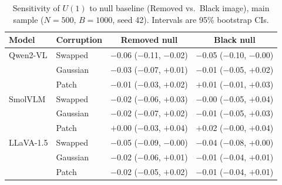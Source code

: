 \begin{table}[t]
\centering
\caption{Sensitivity of $U(1)$ to null baseline (Removed vs.\ Black image),
  main sample ($N=500$, $B=1000$, seed 42). Intervals are 95\% bootstrap CIs.}
\label{tab:nullsens-u}
{\footnotesize\setlength{\tabcolsep}{3pt}%
\begin{tabular}{llcc}
\toprule
\textbf{Model} & \textbf{Corruption} & Removed null & Black null \\
\midrule
Qwen2-VL  & Swapped  & $-$0.06 ($-$0.11, $-$0.02) & $-$0.05 ($-$0.10, $-$0.00) \\
          & Gaussian & $-$0.03 ($-$0.07, $+$0.01) & $-$0.01 ($-$0.05, $+$0.02) \\
          & Patch    & $-$0.01 ($-$0.03, $+$0.02) & $+$0.01 ($-$0.01, $+$0.03) \\
SmolVLM   & Swapped  & $-$0.02 ($-$0.06, $+$0.03) & $-$0.00 ($-$0.05, $+$0.04) \\
          & Gaussian & $-$0.02 ($-$0.07, $+$0.02) & $-$0.01 ($-$0.05, $+$0.03) \\
          & Patch    & $+$0.00 ($-$0.03, $+$0.04) & $+$0.02 ($-$0.00, $+$0.04) \\
LLaVA-1.5 & Swapped  & $-$0.05 ($-$0.09, $-$0.00) & $-$0.04 ($-$0.08, $+$0.00) \\
           & Gaussian & $-$0.02 ($-$0.06, $+$0.01) & $-$0.01 ($-$0.04, $+$0.01) \\
           & Patch    & $-$0.02 ($-$0.05, $+$0.02) & $-$0.01 ($-$0.04, $+$0.01) \\
\bottomrule
\end{tabular}}
\end{table}
